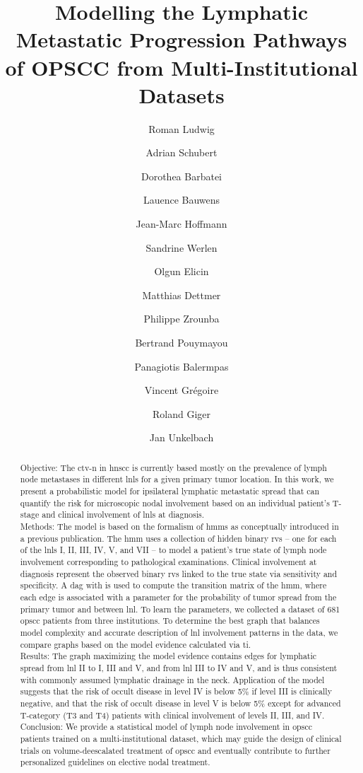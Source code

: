 \documentclass[twocolumn]{aastex631}
\begin{document}
\title{Modelling the Lymphatic Metastatic Progression Pathways of OPSCC from Multi-Institutional Datasets}


\author{Roman Ludwig}
\author{Adrian Schubert}
\author{Dorothea Barbatei}
\author{Lauence Bauwens}
\author{Jean-Marc Hoffmann}
\author{Sandrine Werlen}
\author{Olgun Elicin}
\author{Matthias Dettmer}
\author{Philippe Zrounba}
\author{Bertrand Pouymayou}
\author{Panagiotis Balermpas}
\author{Vincent Grégoire}
\author{Roland Giger}
\author{Jan Unkelbach}

\begin{abstract}
    Objective: The \gls{ctv-n} in \gls{hnscc} is currently based mostly on the prevalence of lymph node metastases in different \glspl{lnl} for a given primary tumor location. In this work, we present a probabilistic model for ipsilateral lymphatic metastatic spread that can quantify the risk for microscopic nodal involvement based on an individual patient's T-stage and clinical involvement of \glspl{lnl} at diagnosis. \\
    Methods: The model is based on the formalism of \glspl{hmm} as conceptually introduced in a previous publication. The \gls{hmm} uses a collection of hidden binary \glspl{rv} -- one for each of the \glspl{lnl} I, II, III, IV, V, and VII -- to model a patient's true state of lymph node involvement corresponding to pathological examinations. Clinical involvement at diagnosis represent the observed binary \glspl{rv} linked to the true state via sensitivity and specificity. A \gls{dag} with is used to compute the transition matrix of the \gls{hmm}, where each edge is associated with a parameter for the probability of tumor spread from the primary tumor and between \gls{lnl}. To learn the parameters, we collected a dataset of 681 \gls{opscc} patients from three institutions. To determine the best graph that balances model complexity and accurate description of \gls{lnl} involvement patterns in the data, we compare graphs based on the model evidence calculated via \gls{ti}. \\
    Results: The graph maximizing the model evidence contains edges for lymphatic spread from \gls{lnl} II to I, III and V, and from \gls{lnl} III to IV and V, and is thus consistent with commonly assumed lymphatic drainage in the neck. Application of the model suggests that the risk of occult disease in level IV is below 5\% if level III is clinically negative, and that the risk of occult disease in level V is below 5\% except for advanced T-category (T3 and T4) patients with clinical involvement of levels II, III, and IV. 
    Conclusion: We provide a statistical model of lymph node involvement in \gls{opscc} patients trained on a multi-institutional dataset, which may guide the design of clinical trials on volume-deescalated treatment of \gls{opscc} and eventually contribute to further personalized guidelines on elective nodal treatment.
\end{abstract}
\end{document}

